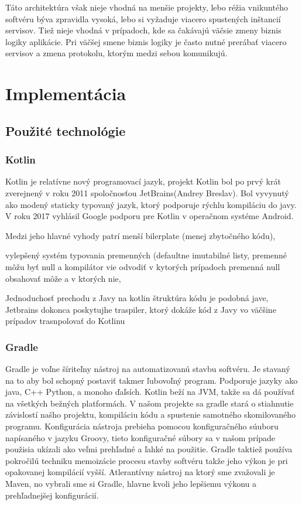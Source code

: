 Táto architektúra však nieje vhodná na menšie projekty, lebo réžia vnikuntého softvéru býva zpravidla vysoká, lebo si vyžaduje viacero spustených inštancií servisov. Tiež nieje vhodná v prípadoch, kde sa čakávajú väčsie zmeny biznis logiky aplikácie. Pri väčšej smene biznis logiky je často nutné prerábať viacero servisov a zmena protokolu, ktorým medzi sebou komunikujú.


\section{Implementácia}

\subsection{Použité technológie}

\subsubsection{Kotlin}
\noindent Kotlin je relatívne nový programovací jazyk, projekt Kotlin bol po prvý krát zverejnený v roku 2011 spoločnosťou JetBrains(Andrey Breslav). Bol vyvynutý ako modený staticky typovaný jazyk, ktorý podporuje rýchlu kompiláciu do javy. V roku 2017 vyhlásil Google podporu pre Kotlin v operačnom systéme Android. 

Medzi jeho hlavné vyhody patrí menší bilerplate (menej zbytočného kódu), 

vylepšený systém typovania premenných (defaultne imutabilné listy, premenné môžu byť null a kompilátor vie odvodiť v kytorých prípadoch premenná null obsahovať môže a v ktorých nie, 

Jednoduchosť prechodu z Javy na kotlin štruktúra kódu je podobná jave, Jetbrains dokonca poskytujhe traspiler, ktorý dokáže kód z Javy vo väčšine prípadov trasnpolovať do Kotlinu

\subsubsection{Gradle}
Gradle je voľne šíriteľny nástroj na automatizovanú stavbu softvéru. Je stavaný na to aby bol schopný postaviť takmer ľubovoľný program. Podporuje jazyky ako java, C++ Python, a monoho ďaľsích. Kotlin beží na JVM, takže sa dá používať na všetkých bežných platformách. V našom projekte sa gradle stará o stiahnutie závislostí našho projektu, kompiláciu kódu a spustenie samotného skomilovaného programu. Konfigurácia nástroja prebieha pomocou konfiguračného súuboru napísaného v jazyku Groovy, tieto konfiguračné  súbory sa v našom prípade použisia ukízali ako veľmi prehľadné a ľahké na použitie. Gradle taktiež používa pokročilú techniku memoizácie procesu stavby softvéru takže jeho výkon je pri opakovanej kompilácií vyšší. Atlerantívny nástroj na ktorý sme zvažovali je Maven, no vybrali sme si Gradle, hlavne kvoli jeho lepšiemu výkonu a prehľadnejšej konfigurácií.

